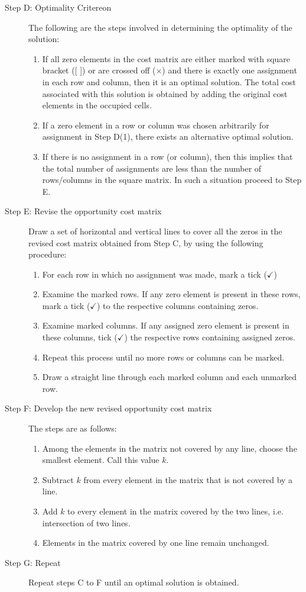 \begin{description}
	\item [Step D: Optimality Critereon] The following are the steps involved in determining the optimality of the solution:
		\begin{enumerate}
			\item  If all zero elements in the cost matrix are either marked with square bracket ([ ]) or are crossed off ($\times$) and there is exactly one assignment in each row and column, then it is an optimal solution. The total cost associated with this solution is obtained by adding the original cost elements in the occupied cells.
			\item  If a zero element in a row or column was chosen arbitrarily for assignment in Step D(1), there exists an alternative optimal solution.
			\item  If there is no assignment in a row (or column), then this implies that the total number of assignments
			are less than the number of rows/columns in the square matrix. In such a situation proceed to Step E.
		\end{enumerate}
	\item [Step E: Revise the opportunity cost matrix] Draw a set of horizontal and vertical lines to cover all the zeros in the revised cost matrix obtained from Step C, by using the following procedure:
		\begin{enumerate}
			\item  For each row in which no assignment was made, mark a tick ($ \checkmark $)
			\item Examine the marked rows. If any zero element is present in these rows, mark a tick ($ \checkmark $) to the respective
			columns containing zeros.
			\item  Examine marked columns. If any assigned zero element is present in these columns, tick ($\checkmark$) the
			respective rows containing assigned zeros.
			\item Repeat this process until no more rows or columns can be marked.
			\item  Draw a straight line through each marked column and each unmarked row.
		\end{enumerate}
	\item [Step F:  Develop the new revised opportunity cost matrix] The steps are as follows:
		\begin{enumerate}
			\item  Among the elements in the matrix not covered by any line, choose the smallest element. Call this
			value $ k $.
			\item Subtract $ k $ from every element in the matrix that is not covered by a line.
			\item  Add $ k $ to every element in the matrix covered by the two lines, i.e. intersection of two lines.
			\item Elements in the matrix covered by one line remain unchanged.
		\end{enumerate}
	\item [Step G: Repeat] Repeat steps C to F until an optimal solution is obtained.
\end{description}
